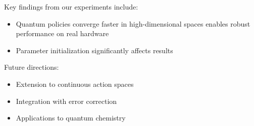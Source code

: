 Key findings from our experiments include:

\begin{itemize}
    \item Quantum policies converge faster in high-dimensional spaces
     enables robust performance on real hardware
    \item Parameter initialization significantly affects results
\end{itemize}

Future directions:
\begin{itemize}
    \item Extension to continuous action spaces
    \item Integration with error correction
    \item Applications to quantum chemistry
\end{itemize}
